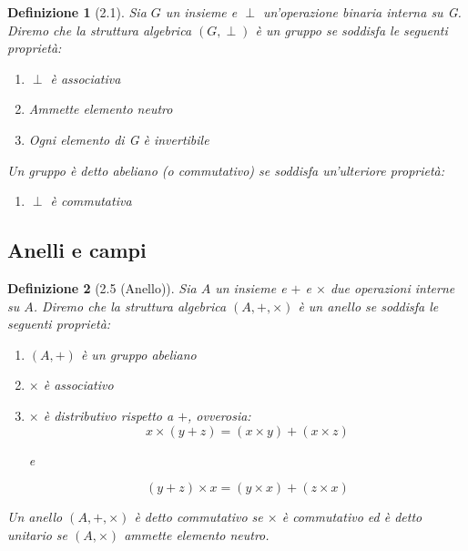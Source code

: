 \documentclass[11pt,a4paper]{article}
\theoremstyle{manuale}
\newtheorem*{definizione}{Definizione}
\theoremstyle{manualecorsivo}
\begin{document}
	\begin{definizione}[2.1]
		Sia $G$ un insieme e $\perp$ un'operazione binaria interna su G. Diremo che la struttura algebrica $(G, \perp)$ è un gruppo se soddisfa le seguenti proprietà:
		
		\begin{enumerate}[label=\roman*)]
			
			\item $\perp$ è associativa
			\item Ammette elemento neutro
			\item Ogni elemento di G è invertibile
			
		\end{enumerate}
		
		Un gruppo è detto abeliano (o commutativo) se soddisfa un'ulteriore proprietà:
		
		\begin{enumerate}[label=\roman*), start=4]
			\item $\perp$ è commutativa
		\end{enumerate}
		
	\end{definizione}
	
	\subsection{Anelli e campi}
	
	\begin{definizione}[2.5 (Anello)]
		Sia $A$ un insieme e $+$ e $\times$ due operazioni interne su $A$. Diremo che la struttura algebrica $(A, +, \times)$ è un anello se soddisfa le seguenti proprietà:
		
		\begin{enumerate}[label=\roman*)]
			\item $(A, +)$ è un gruppo abeliano
			\item $\times$ è associativo
			\item $\times$ è distributivo rispetto a $+$, ovverosia:
			$$x \times (y+z) = (x \times y) + (x \times z)$$
			\begin{center}
				e
			\end{center}
			$$(y+z)\times x = (y \times x) + (z \times x)$$
		\end{enumerate}
		
		Un anello $(A, +, \times)$ è detto commutativo se $\times$ è commutativo ed è detto unitario se $(A, \times)$ ammette elemento neutro.
		
	\end{definizione}
	
\end{document}
